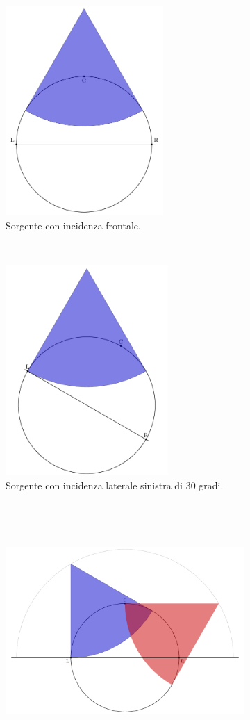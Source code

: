 \begin{figure}[t!]
    \centering
    \begin{subfigure}[t]{0.45\textwidth}
        \centering
        \includegraphics[height=8cm]{CAPITOLI/_TIKZ/PANNING/pan-frontal}
        \caption{Sorgente con incidenza frontale.}
        \label{pan:frontal}
    \end{subfigure}%
    ~
    \begin{subfigure}[t]{0.45\textwidth}
        \centering
        \includegraphics[height=8cm]{CAPITOLI/_TIKZ/PANNING/pan-left}
        \caption{Sorgente con incidenza laterale sinistra di 30 gradi.}
        \label{pan:left}
    \end{subfigure}
    \\
    \begin{subfigure}[t]{0.9\textwidth}
        \centering
        \includegraphics[height=8cm]{CAPITOLI/_TIKZ/PANNING/pan-both}

\end{subfigure}
\end{figure}
